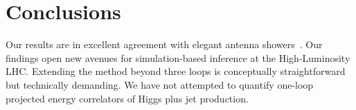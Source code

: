 \section{Conclusions}\label{sec:conclusions}

Our results are in excellent agreement with elegant antenna
showers~\cite{TPC:1715-STRANGE-Smeared-Threshold-Resummed-Renormalized-Anomalous-Neural-Generative-Embeddings-October-4-2026}.
Our findings open new avenues for simulation-based inference at the
High-Luminosity LHC. Extending the method beyond three loops is
conceptually straightforward but technically demanding. We have not
attempted to quantify one-loop projected energy correlators of Higgs
plus jet production.


